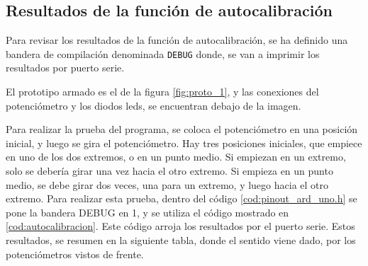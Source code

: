 \subsection{Resultados de la función de autocalibración}

Para revisar los resultados de la función de autocalibración, se ha definido una bandera de compilación denominada \texttt{DEBUG} donde, se van a imprimir los resultados por puerto serie. 

El prototipo armado es el de la figura \ref{fig:proto_1}, y las conexiones del potenciómetro y los diodos leds, se encuentran debajo de la imagen.  
%

Para realizar la prueba del programa, se coloca el potenciómetro en una posición inicial, y luego se gira el potenciómetro. Hay tres posiciones iniciales, que empiece en uno de los dos extremos, o en un punto medio. Si empiezan en un extremo, solo se debería girar una vez hacia el otro extremo. Si empieza en un punto medio, se debe girar dos veces, una para un extremo, y luego hacia el otro extremo. Para realizar esta prueba, dentro del código \ref{cod:pinout_ard_uno.h} se pone la bandera DEBUG en 1, y se utiliza el código mostrado en \ref{cod:autocalibracion}. Este código arroja los resultados por el puerto serie. Estos resultados, se resumen en la siguiente tabla, donde el sentido viene dado, por los potenciómetros vistos de frente.    


